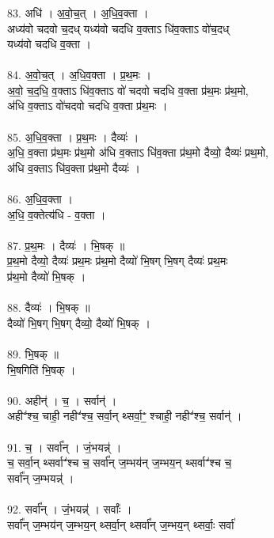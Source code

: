 \subsubsection{}
83. अधि॑ । अ॒वो॒च॒त् । अ॒धि॒व॒क्ता ।\\
अध्य॑वो चदवो च॒दध् यध्य॑वो चदधि व॒क्ताऽ धि॑व॒क्ताऽ वो॑च॒दध्\\
यध्य॑वो चदधि व॒क्ता ।\\
\\
84. अ॒वो॒च॒त् । अ॒धि॒व॒क्ता । प्र॒थ॒मः ।\\
अ॒वो॒ च॒द॒धि॒ व॒क्ताऽ धि॑व॒क्ताऽ वो॑ चदवो चदधि व॒क्ता प्र॑थ॒मः प्र॑थ॒मो,\\
अ॑धि व॒क्ताऽ वो॑चदवो चदधि व॒क्ता प्र॑थ॒मः ।\\
\\
85. अ॒धि॒व॒क्ता । प्र॒थ॒मः । दैव्यः॑ ।\\
अ॒धि॒ व॒क्ता प्र॑थ॒मः प्र॑थ॒मो अ॑धि व॒क्ताऽ धि॑व॒क्ता प्र॑थ॒मो दैव्यो॒ दैव्यः॑ प्रथ॒मो,\\
अ॑धि व॒क्ताऽ धि॑व॒क्ता प्र॑थ॒मो दैव्यः॑ ।\\
\\
86. अ॒धि॒व॒क्ता ।\\
अ॒धि॒ व॒क्तेत्य॑धि - व॒क्ता ।\\
\\
87. प्र॒थ॒मः । दैव्यः॑ । भि॒षक् ॥\\
प्र॒थ॒मो दैव्यो॒ दैव्यः॑ प्रथ॒मः प्र॑थ॒मो दैव्यो॑ भि॒षग् भि॒षग् दैव्यः॑ प्रथ॒मः\\
प्र॑थ॒मो दैव्यो॑ भि॒षक् ।\\
\\
88. दैव्यः॑ । भि॒षक् ॥\\
दैव्यो॑ भि॒षग् भि॒षग् दैव्यो॒ दैव्यो॑ भि॒षक् ।\\
\\
89. भि॒षक् ॥\\
भि॒षगिति॑ भि॒षक् ।\\
\\
90. अहीन्॑ । च॒ । सर्वान्॑ ।\\
अहीꣲ॑श्च॒ चाही॒ नहीꣲ॑श्च॒ सर्वा॒न् थ्सर्वा॒ꣲ॒ श्चाही॒ नहीꣲ॑श्च॒ सर्वान्॑ ।\\
\\
91. च॒ । सर्वा᳚न् । जं॒भयन्न्॑ ।\\
च॒ सर्वा॒न् थ्सर्वाꣲ॑श्च च॒ सर्वा᳚न् ज॒म्भय॑न् ज॒म्भय॒न् थ्सर्वाꣲ॑श्च च॒\\
सर्वा᳚न् ज॒म्भयन्न्॑ ।\\
\\
92. सर्वा᳚न् । जं॒भयन्न्॑ । सर्वाः᳚ ।\\
सर्वा᳚न् ज॒म्भय॑न् ज॒म्भय॒न् थ्सर्वा॒न् थ्सर्वा᳚न् ज॒म्भय॒न् थ्सर्वाः॒ सर्वा॑\\
